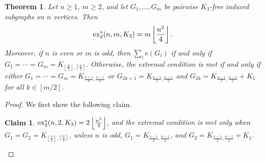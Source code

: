 \documentclass[12pt]{report}
\newtheorem{theorem}{Theorem}[chapter]
\newtheorem{claim}{Claim}[theorem]
\newcommand*{\dex}{\textnormal{ex}_2}
\begin{document}
\begin{theorem}\label{thm:induce-triangle}
  Let $n \geq 1$, $m \geq 2$, and let $G_1, \ldots, G_m$ be pairwise $K_3$-free induced subgraphs on $n$ vertices. Then
  \[
    \dex^*(n, m, K_3) = m \left\lfloor \frac{n^2}{4} \right\rfloor.
  \]
  Moreover, if $n$ is even or $m$ is odd, then $\sum_i e(G_i)$ if and only if $G_1 = \cdots = G_m = K_{\left\lfloor\frac{n}{2}\right\rfloor, \left\lceil\frac{n}{2}\right\rceil}$. Otherwise, the extremal condition is met if and only if either $G_1 = \cdots = G_m = K_{\frac{n + 1}{2}, \frac{n - 1}{2}}$ or $G_{2k + 1} = K_{\frac{n - 1}{2}, \frac{n - 1}{2}}$ and $G_{2k} = K_{\frac{n - 1}{2}, \frac{n - 1}{2}} + K_1$ for all $k \in [m/2]$.
\end{theorem}

\begin{proof}
  
  We first show the following claim.

  \begin{claim}\label{claim:induce-triangle}
    $\dex^*(n, 2, K_3) = 2\left\lfloor\frac{n^2}{4}\right\rfloor$, and the extremal condition is met only when $G_1 = G_2 = K_{\left\lfloor\frac{n}{2}\right\rfloor, \left\lceil\frac{n}{2}\right\rceil}$, unless $n$ is odd, $G_1 = K_{\frac{n - 1}{2}, \frac{n - 1}{2}}$, and $G_2 = K_{\frac{n - 1}{2}, \frac{n - 1}{2}} + K_1$.
  \end{claim}


\end{proof}
\end{document}
